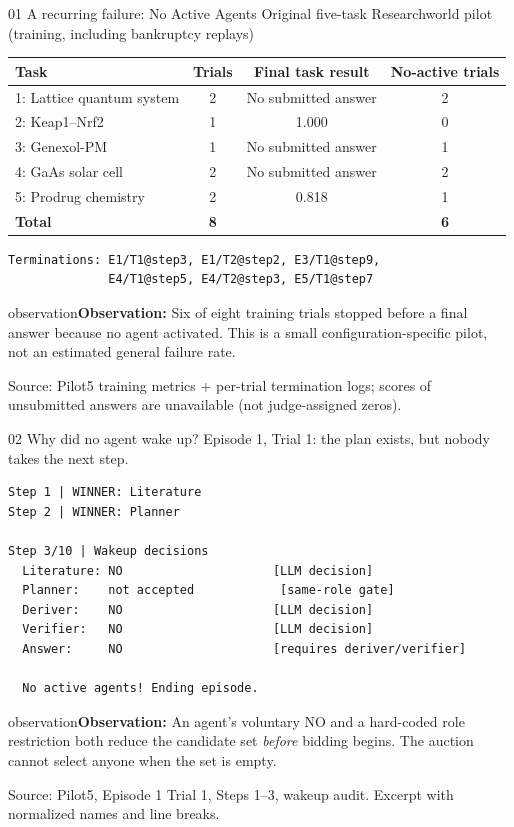 \documentclass[aspectratio=169,10pt]{beamer}
\newcommand{\observation}[1]{\vspace{2mm}\begin{beamercolorbox}[rounded=true,sep=1ex,wd=\textwidth]{observation}\small\textbf{Observation:} #1\end{beamercolorbox}}
\newcommand{\source}[1]{\vfill{\tiny\textcolor{muted}{Source: #1}}}
\begin{document}
\begin{frame}[fragile]{01 \quad A recurring failure: No Active Agents}
\small\textcolor{muted}{Original five-task Researchworld pilot (training, including bankruptcy replays)}
\vspace{1mm}
\centering
\begin{tabular}{lccc}
\toprule
Task & Trials & Final task result & No-active trials\\
\midrule
1: Lattice quantum system & 2 & No submitted answer & 2\\
2: Keap1--Nrf2 & 1 & 1.000 & 0\\
3: Genexol-PM & 1 & No submitted answer & 1\\
4: GaAs solar cell & 2 & No submitted answer & 2\\
5: Prodrug chemistry & 2 & 0.818 & 1\\
\midrule
\textbf{Total} & \textbf{8} & & \textbf{6}\\
\bottomrule
\end{tabular}
\par\vspace{2mm}
\begin{lstlisting}
Terminations: E1/T1@step3, E1/T2@step2, E3/T1@step9,
              E4/T1@step5, E4/T2@step3, E5/T1@step7
\end{lstlisting}
\observation{Six of eight training trials stopped before a final answer because no agent activated. This is a small configuration-specific pilot, not an estimated general failure rate.}
\source{Pilot5 training metrics + per-trial termination logs; scores of unsubmitted answers are unavailable (not judge-assigned zeros).}
\end{frame}

\begin{frame}[fragile]{02 \quad Why did no agent wake up?}
\small\textcolor{muted}{Episode 1, Trial 1: the plan exists, but nobody takes the next step.}
\begin{lstlisting}
Step 1 | WINNER: Literature
Step 2 | WINNER: Planner

Step 3/10 | Wakeup decisions
  Literature: NO                     [LLM decision]
  Planner:    not accepted            [same-role gate]
  Deriver:    NO                     [LLM decision]
  Verifier:   NO                     [LLM decision]
  Answer:     NO                     [requires deriver/verifier]

  No active agents! Ending episode.
\end{lstlisting}
\observation{An agent's voluntary NO and a hard-coded role restriction both reduce the candidate set \emph{before} bidding begins. The auction cannot select anyone when the set is empty.}
\source{Pilot5, Episode 1 Trial 1, Steps 1--3, wakeup audit. Excerpt with normalized names and line breaks.}
\end{frame}
\end{document}
